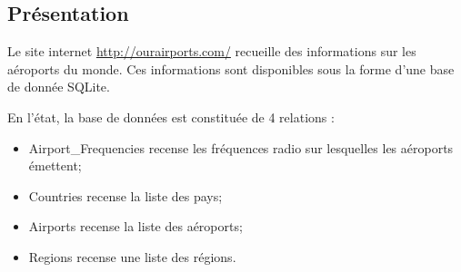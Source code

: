 \documentclass[10pt,fleqn]{article} %
\begin{document}

\vspace{2cm}
\pagestyle{fancy}
\thispagestyle{plain}


\subsection*{Présentation}
\ifprof
\else

Le site internet \url{http://ourairports.com/} recueille des informations sur les aéroports du monde. Ces informations sont disponibles sous la forme d'une base de donnée SQLite. 


%








En l'état, la base de données est constituée de 4 relations : 
\begin{itemize}
\item \textsf{Airport\_Frequencies} recense les fréquences radio sur lesquelles les aéroports émettent;
\item \textsf{Countries} recense la liste des pays;
\item \textsf{Airports} recense la liste des aéroports;
\item \textsf{Regions} recense une liste des régions.
\end{itemize}
\end{document}
